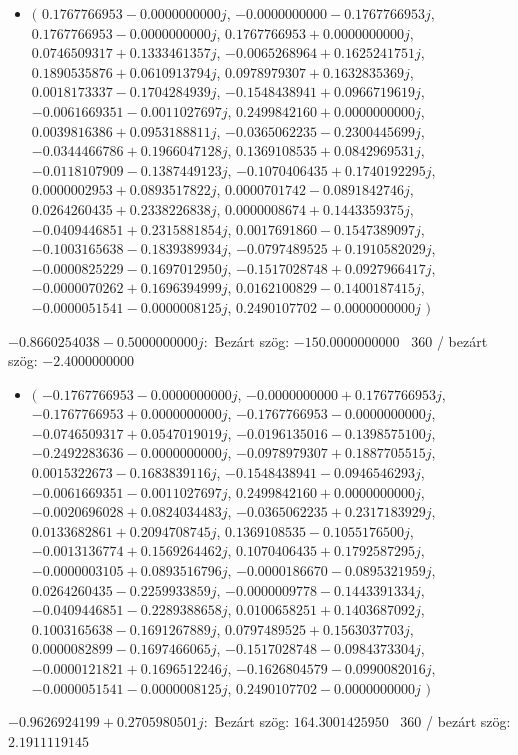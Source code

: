 \documentclass[14pt,a4paper]{article}
\begin{document}
\begin{itemize}
\item
$\big($
$0.1767766953-0.0000000000j$, $-0.0000000000-0.1767766953j$, $0.1767766953-0.0000000000j$, $0.1767766953+0.0000000000j$, $0.0746509317+0.1333461357j$, $-0.0065268964+0.1625241751j$, $0.1890535876+0.0610913794j$, $0.0978979307+0.1632835369j$, $0.0018173337-0.1704284939j$, $-0.1548438941+0.0966719619j$, $-0.0061669351-0.0011027697j$, $0.2499842160+0.0000000000j$, $0.0039816386+0.0953188811j$, $-0.0365062235-0.2300445699j$, $-0.0344466786+0.1966047128j$, $0.1369108535+0.0842969531j$, $-0.0118107909-0.1387449123j$, $-0.1070406435+0.1740192295j$, $0.0000002953+0.0893517822j$, $0.0000701742-0.0891842746j$, $0.0264260435+0.2338226838j$, $0.0000008674+0.1443359375j$, $-0.0409446851+0.2315881854j$, $0.0017691860-0.1547389097j$, $-0.1003165638-0.1839389934j$, $-0.0797489525+0.1910582029j$, $-0.0000825229-0.1697012950j$, $-0.1517028748+0.0927966417j$, $-0.0000070262+0.1696394999j$, $0.0162100829-0.1400187415j$, $-0.0000051541-0.0000008125j$, $0.2490107702-0.0000000000j$
$\big)$
\end{itemize}
$-0.8660254038-0.5000000000j$:\
Bezárt szög: $-150.0000000000$ \
360 / bezárt szög: $-2.4000000000$\
\begin{itemize}
\item
$\big($
$-0.1767766953-0.0000000000j$, $-0.0000000000+0.1767766953j$, $-0.1767766953+0.0000000000j$, $-0.1767766953-0.0000000000j$, $-0.0746509317+0.0547019019j$, $-0.0196135016-0.1398575100j$, $-0.2492283636-0.0000000000j$, $-0.0978979307+0.1887705515j$, $0.0015322673-0.1683839116j$, $-0.1548438941-0.0946546293j$, $-0.0061669351-0.0011027697j$, $0.2499842160+0.0000000000j$, $-0.0020696028+0.0824034483j$, $-0.0365062235+0.2317183929j$, $0.0133682861+0.2094708745j$, $0.1369108535-0.1055176500j$, $-0.0013136774+0.1569264462j$, $0.1070406435+0.1792587295j$, $-0.0000003105+0.0893516796j$, $-0.0000186670-0.0895321959j$, $0.0264260435-0.2259933859j$, $-0.0000009778-0.1443391334j$, $-0.0409446851-0.2289388658j$, $0.0100658251+0.1403687092j$, $0.1003165638-0.1691267889j$, $0.0797489525+0.1563037703j$, $0.0000082899-0.1697466065j$, $-0.1517028748-0.0984373304j$, $-0.0000121821+0.1696512246j$, $-0.1626804579-0.0990082016j$, $-0.0000051541-0.0000008125j$, $0.2490107702-0.0000000000j$
$\big)$
\end{itemize}
$-0.9626924199+0.2705980501j$:\
Bezárt szög: $164.3001425950$ \
360 / bezárt szög: $2.1911119145$\
\end{document}
